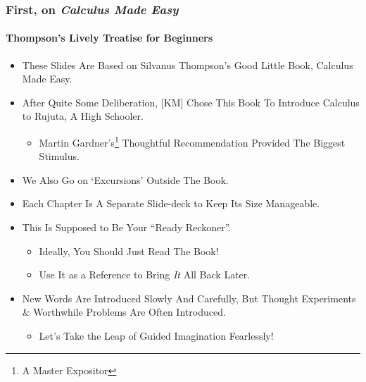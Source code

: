 \begin{frame}
\frametitle{First, on \textit{Calculus Made Easy}}
\framesubtitle{Thompson's Lively Treatise for Beginners}
\label{slide:intro1}
\begin{itemize}
\pause
\item These Slides Are Based on \alert{Silvanus Thompson's Good Little Book, Calculus Made Easy}.
\pause
\item After Quite Some Deliberation, [KM] Chose This Book To Introduce Calculus to Rujuta, A High Schooler.
\begin{itemize}
\pause
\item \alert{Martin Gardner's\footnote{A Master Expositor} Thoughtful Recommendation} Provided The Biggest Stimulus.
\end{itemize}
\pause
\item We Also Go on \alert{`Excursions' Outside The Book}.
\pause
\item Each Chapter Is A Separate Slide-deck to Keep Its Size Manageable.
\pause
\item This Is Supposed to Be Your \alert{``Ready Reckoner''}.
\begin{itemize}
\pause
\item Ideally, You Should Just Read The Book!
\pause
\item Use It as a Reference to \alert{Bring \textit{It} All Back} Later.
\end{itemize}
\pause
\item New Words Are Introduced Slowly And Carefully, But \alert{Thought Experiments} \& \alert{Worthwhile Problems} Are Often Introduced. 
\begin{itemize}
\pause
\item Let's \alert{Take the Leap of Guided Imagination Fearlessly}!
\end{itemize}
\end{itemize}
\end{frame}

